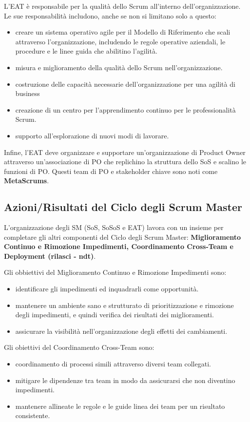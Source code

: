 \documentclass[12pt,a4paper,parskip=full]{scrartcl}
\begin{document}
L'EAT è responsabile per la qualità dello Scrum all'interno dell'organizzazione.
Le sue responsabilità includono, anche se non si limitano solo a questo:
\begin{itemize}
\item creare un sistema operativo agile per il Modello di Riferimento che scali attraverso l'organizzazione, includendo le regole operative aziendali, le procedure e le linee guida che abilitino l'agilità.
\item misura e miglioramento della qualità dello Scrum nell'organizzazione.
\item costruzione delle capacità necessarie dell'organizzazione per una agilità di business 
\item creazione di un centro per l'apprendimento continuo per le professionalità Scrum.
\item supporto all'esplorazione di nuovi modi di lavorare.
\end{itemize}
Infine, l'EAT deve organizzare e supportare un'organizzazione di Product Owner attraverso un'associazione di PO che replichino la struttura dello SoS e scalino le funzioni di PO. Questi team di PO e stakeholder chiave sono noti come  \textbf{MetaScrums}.

\subsection{Azioni/Risultati del Ciclo degli Scrum Master}
L'organizzazione degli SM (SoS, SoSoS e EAT) lavora con un insieme per completare gli altri componenti del Ciclo degli Scrum Master: \textbf{Miglioramento Continuo e
 Rimozione Impedimenti, Coordinamento Cross-Team e Deployment (rilasci - ndt)}.

Gli obbiettivi del Miglioramento Continuo e Rimozione Impedimenti sono:
\begin{itemize}
\item identificare gli impedimenti ed inquadrarli come opportunità.
\item mantenere un ambiente sano e strutturato di prioritizzazione e rimozione degli impedimenti, e quindi verifica dei risultati dei miglioramenti.
\item assicurare la visibilità nell'organizzazione degli effetti dei cambiamenti.
\end{itemize}

Gli obiettivi del Coordinamento Cross-Team sono:
\begin{itemize}
\item coordinamento di processi simili attraverso diversi team collegati.
\item mitigare le dipendenze tra team in modo da assicurarsi che non diventino impedimenti.
\item mantenere allineate le regole e le guide linea dei team per un risultato consistente.
\end{itemize}
\end{document}

